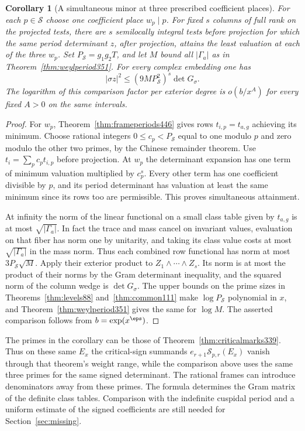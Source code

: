 \documentclass[a4paper,11pt]{article}
\newtheorem{corollary}[proposition]{Corollary}
\theoremstyle{definition}
\theoremstyle{remark}
\numberwithin{equation}{section}
\newcommand{\Sel}{\mathcal S}
\begin{document}
\begin{corollary}[A simultaneous minor at three prescribed coefficient places]\leavevmode
\label{cor:threeminor447}
For each \(p\in\mathcal S\) choose one coefficient place \(w_p\mid p\).
For fixed \(s\) columns of full rank on the projected tests,
there are \(s\) semilocally integral tests before projection for which
the same period determinant \(z\), after projection, attains the
least valuation at each of the three \(w_p\). Set
\(P_{\mathcal S}=g_1g_2T\), and let \(M\) bound all \(|\Gamma_a|\)
as in Theorem~\ref{thm:weylperiod351}. For every complex embedding
one has
\[
                |\sigma z|^2\le(9 M P_{\mathcal S}^2)^s\det G_\sigma .
\]
The logarithm of this comparison factor per exterior degree is
\(o(b/x^A)\) for every fixed \(A>0\) on the same intervals.
\end{corollary}
\begin{proof}
For \(w_p\), Theorem~\ref{thm:frameperiods446} gives rows
\(t_{i,p}=t_{a,g}\) achieving its minimum. Choose rational integers
\(0\le c_p<P_{\mathcal S}\) equal to one modulo \(p\) and zero
modulo the other two primes, by the Chinese remainder theorem.
Use \(t_i=\sum_p c_p t_{i,p}\) before projection. At \(w_p\) the
determinant expansion has one term of minimum valuation multiplied
by \(c_p^s\). Every other term has one coefficient divisible by
\(p\), and its period determinant has valuation at least the same
minimum since its rows too are permissible. This proves simultaneous
attainment.

At infinity the norm of the linear functional on a small class
table given by \(t_{a,g}\) is at most
\(\sqrt{|\Gamma_a|}\). In fact the trace and mass
cancel on invariant values, evaluation on that fiber has norm
one by unitarity, and taking its class value
costs at most \(\sqrt{|\Gamma_a|}\) in the mass norm. Thus each
combined row functional has norm at most
\(3P_{\mathcal S}\sqrt{M}\). Apply their exterior product to
\(Z_1\wedge\cdots\wedge Z_s\). Its norm is at most the product
of their norms by the Gram determinant inequality, and the squared
norm of the column wedge is \(\det G_\sigma\). The upper bounds
on the prime sizes in Theorems~\ref{thm:levels88}
and~\ref{thm:common111} make \(\log P_{\mathcal S}\) polynomial
in \(x\), and Theorem~\ref{thm:weylperiod351} gives the same for
\(\log M\). The asserted comparison follows from \(b=\exp(x^\eps)\).
\end{proof}

The primes in the corollary can be those of
Theorem~\ref{thm:criticalmarks339}. Thus on these same \(E_x\)
the critical-sign summands \(e_{r+1}\Sel_{p,r}(E_x)\) vanish
through that theorem's weight range, while the comparison above
uses the same three primes for the same signed determinant.
The rational frames can introduce denominators away from these
primes. The formula determines the Gram matrix of the definite
class tables. Comparison with the indefinite cuspidal period and
a uniform estimate of the signed coefficients are still needed
for Section~\ref{sec:missing}.
\end{document}
